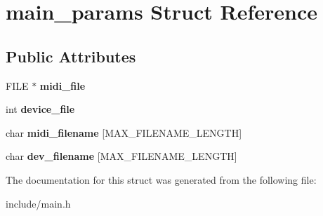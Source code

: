 \hypertarget{structmain__params}{}\section{main\+\_\+params Struct Reference}
\label{structmain__params}
\subsection*{Public Attributes}
\begin{DoxyCompactItemize}
\item 
\mbox{\label{structmain__params_a9eaa26f263d87cc4b8d0de019e7d7aa0}} 
F\+I\+LE $\ast$ {\bfseries midi\+\_\+file}
\item 
\mbox{\label{structmain__params_ad559aa0a7e7de590fb105fb64e79237d}} 
int {\bfseries device\+\_\+file}
\item 
\mbox{\label{structmain__params_a42bfe163e004189c2ca515ef8c39d850}} 
char {\bfseries midi\+\_\+filename} \mbox{[}M\+A\+X\+\_\+\+F\+I\+L\+E\+N\+A\+M\+E\+\_\+\+L\+E\+N\+G\+TH\mbox{]}
\item 
\mbox{\label{structmain__params_a69b0de54c7bbe6e88cf79a291656cd38}} 
char {\bfseries dev\+\_\+filename} \mbox{[}M\+A\+X\+\_\+\+F\+I\+L\+E\+N\+A\+M\+E\+\_\+\+L\+E\+N\+G\+TH\mbox{]}
\end{DoxyCompactItemize}


The documentation for this struct was generated from the following file\+:\begin{DoxyCompactItemize}
\item 
include/main.\+h\end{DoxyCompactItemize}
